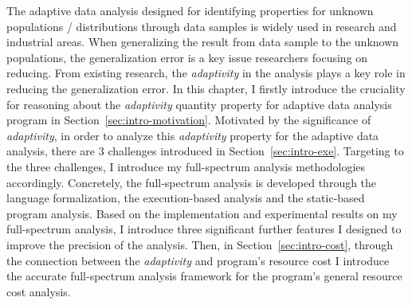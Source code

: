 
The adaptive data analysis designed for identifying  properties for unknown populations / distributions 
through data samples is widely 
used in research and industrial areas.
When generalizing the result from data sample to the unknown populations, 
the generalization error is a key issue researchers focusing on reducing.
From existing research, the \emph{adaptivity} in the analysis plays a key role in reducing the generalization error.
In this chapter, 
I firstly introduce the  cruciality for reasoning about the \emph{adaptivity} quantity property 
for adaptive data analysis program in Section~\ref{sec:intro-motivation}.
Motivated by the significance of \emph{adaptivity},
in order to analyze this \emph{adaptivity} property for the adaptive data analysis, there are 3 challenges
introduced in Section~\ref{sec:intro-exe}.
Targeting to the three challenges, I introduce my full-spectrum analysis methodologies accordingly.
Concretely, the full-spectrum analysis is developed through the language formalization,
the execution-based analysis and the static-based program analysis.
%
Based on the implementation and experimental results on my full-spectrum analysis, 
I introduce three significant 
further features I designed to improve the precision of the analysis.
%
 Then, in Section~\ref{sec:intro-cost}, through the connection between the \emph{adaptivity} and program's resource cost
I introduce 
 the accurate full-spectrum analysis framework for the program's general resource cost analysis.
